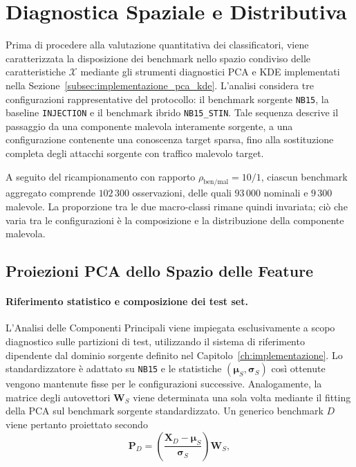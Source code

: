 
\section{Diagnostica Spaziale e Distributiva}
\label{sec:diagnostica_spaziale_distributiva}

Prima di procedere alla valutazione quantitativa dei classificatori, viene caratterizzata la disposizione dei benchmark nello spazio condiviso delle caratteristiche $\mathcal{X}$ mediante gli strumenti diagnostici PCA e KDE implementati nella Sezione~\ref{subsec:implementazione_pca_kde}.
L'analisi considera tre configurazioni rappresentative del protocollo: il benchmark sorgente \texttt{NB15}, la baseline \texttt{INJECTION} e il benchmark ibrido \texttt{NB15\_STIN}. 
Tale sequenza descrive il passaggio da una componente malevola interamente sorgente, a una configurazione contenente una conoscenza target sparsa, fino alla sostituzione completa degli attacchi sorgente con traffico malevolo target.

A seguito del ricampionamento con rapporto $\rho_{\mathrm{ben}/\mathrm{mal}}=10/1$, ciascun benchmark aggregato comprende $102\,300$ osservazioni, delle quali $93\,000$ nominali e $9\,300$ malevole.
La proporzione tra le due macro-classi rimane quindi invariata; ciò che varia tra le configurazioni è la composizione e la distribuzione della componente malevola.



\subsection{Proiezioni PCA dello Spazio delle Feature}
\label{subsec:proiezioni_pca}

\paragraph{Riferimento statistico e composizione dei test set.}
L'Analisi delle Componenti Principali viene impiegata esclusivamente a scopo diagnostico sulle partizioni di test, utilizzando il sistema di riferimento dipendente dal dominio sorgente definito nel Capitolo~\ref{ch:implementazione}. 
Lo standardizzatore è adattato su \texttt{NB15} e le statistiche $(\boldsymbol{\mu}_{S},\boldsymbol{\sigma}_{S})$ così ottenute vengono mantenute fisse per le configurazioni successive. Analogamente, la matrice degli autovettori $\mathbf{W}_{S}$ viene determinata una sola volta mediante il fitting della PCA sul benchmark sorgente standardizzato. Un generico benchmark $D$ viene pertanto proiettato secondo
\begin{equation}
    \mathbf{P}_{D}
    =
    \left(
        \frac{\mathbf{X}_{D}-\boldsymbol{\mu}_{S}}
             {\boldsymbol{\sigma}_{S}}
    \right)
    \mathbf{W}_{S},
\end{equation}

